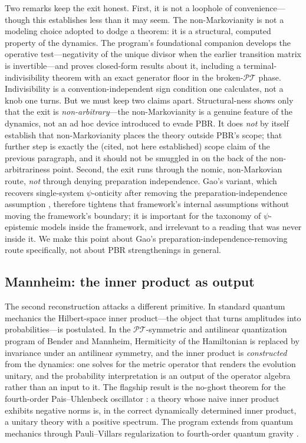\documentclass[11pt]{article}
\newcommand{\PT}{\mathcal{PT}}
\theoremstyle{remark}
\begin{document}
Two remarks keep the exit honest. First, it is not a loophole of
convenience---though this establishes less than it may seem. The
non-Markovianity is not a modeling choice adopted to dodge a theorem:
it is a structural, computed property of the dynamics. The program's
foundational companion \cite{indivisible} develops the operative
test---negativity of the unique divisor when the earlier transition
matrix is invertible---and proves closed-form results about it,
including a terminal-indivisibility theorem with an exact generator
floor in the broken-$\PT$ phase. Indivisibility is a
convention-independent sign condition one calculates, not a knob one
turns. But we must keep two claims apart. Structural-ness shows only
that the exit is \emph{non-arbitrary}---the non-Markovianity is a
genuine feature of the dynamics, not an ad hoc device introduced to
evade PBR. It does \emph{not} by itself establish that non-Markovianity
places the theory outside PBR's scope; that further step is exactly the
(cited, not here established) scope claim of the previous paragraph,
and it should not be smuggled in on the back of the non-arbitrariness
point. Second, the exit runs through the nomic, non-Markovian route,
\emph{not} through denying preparation independence. Gao's variant,
which recovers single-system $\psi$-onticity after removing the
preparation-independence assumption \cite{PBRnoPI}, therefore tightens
that framework's internal assumptions without moving the framework's
boundary; it is important for the taxonomy of $\psi$-epistemic models
inside the framework, and irrelevant to a reading that was never inside
it. We make this point about Gao's preparation-independence-removing
route specifically, not about PBR strengthenings in general.

\subsection{Mannheim: the inner product as output}
\label{sec:mannheim}

The second reconstruction attacks a different primitive. In standard
quantum mechanics the Hilbert-space inner product---the object that
turns amplitudes into probabilities---is postulated. In the
$\PT$-symmetric and antilinear quantization program of Bender and
Mannheim, Hermiticity of the Hamiltonian is replaced by invariance
under an antilinear symmetry, and the inner product is
\emph{constructed} from the dynamics: one solves for the metric
operator that renders the evolution unitary, and the probability
interpretation is an output of the operator algebra rather than an
input to it. The flagship result is the no-ghost theorem for the
fourth-order Pais--Uhlenbeck oscillator \cite{BenderMannheim2008}:
a theory whose naive inner product exhibits negative norms is, in the
correct dynamically determined inner product, a unitary theory with a
positive spectrum. The program extends from quantum mechanics through
Pauli--Villars regularization to fourth-order quantum gravity
\cite{Mannheim2020}.
\end{document}
